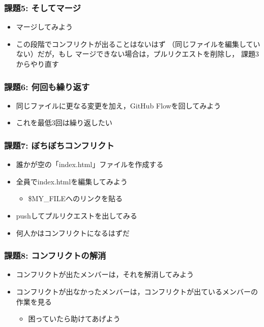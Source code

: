 \documentclass[a4paper,twoside,twocolumn]{bxjsarticle}
\begin{document}
\subsubsection{課題5: そしてマージ}
\label{sec-2-1-5}
\begin{itemize}
\item マージしてみよう
\item この段階でコンフリクトが出ることはないはず
（同じファイルを編集していない）だが，もし
マージできない場合は，プルリクエストを削除し，
課題3からやり直す
\end{itemize}

\subsubsection{課題6: 何回も繰り返す}
\label{sec-2-1-6}
\begin{itemize}
\item 同じファイルに更なる変更を加え，GitHub Flowを回してみよう
\item これを最低3回は繰り返したい
\end{itemize}

\subsubsection{課題7: ぼちぼちコンフリクト}
\label{sec-2-1-7}
\begin{itemize}
\item 誰かが空の「index.html」ファイルを作成する
\item 全員でindex.htmlを編集してみよう
\begin{itemize}
\item \$MY\_FILEへのリンクを貼る
\end{itemize}
\item pushしてプルリクエストを出してみる
\item 何人かはコンフリクトになるはずだ
\end{itemize}

\subsubsection{課題8: コンフリクトの解消}
\label{sec-2-1-8}
\begin{itemize}
\item コンフリクトが出たメンバーは，それを解消してみよう
\item コンフリクトが出なかったメンバーは，コンフリクトが出ているメンバーの
作業を見る
\begin{itemize}
\item 困っていたら助けてあげよう
\end{itemize}
\end{itemize}
\end{document}
